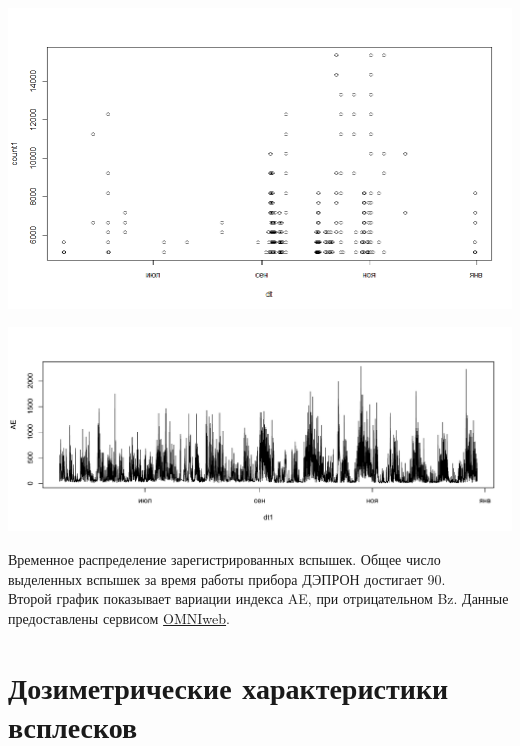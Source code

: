 \documentclass[t, aspectratio=43]{beamer}
\begin{document}
\begin{frame}	
\frametitle{\insertsection} 
\centering

\includegraphics[width=0.7\linewidth, trim={0 2cm 0 0}, clip]{images/Flash/Rplot03.png}

\includegraphics[width=0.7\linewidth, trim={0 1.5cm 0 1cm}, clip]{images/Flash/Rplot01}

\tiny{Временное распределение зарегистрированных вспышек. Общее число выделенных вспышек за время работы прибора ДЭПРОН достигает 90.\\ Второй график показывает вариации индекса AE, при отрицательном Bz. Данные предоставлены сервисом  \href{https://omniweb.gsfc.nasa.gov/}{OMNIweb}.}

\end{frame}
\section{Дозиметрические характеристики всплесков}
\end{document}
